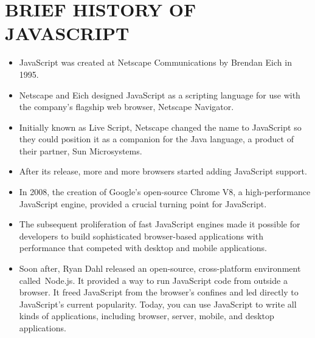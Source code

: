 \documentclass{article}
\begin{document}
		\section*{BRIEF HISTORY OF JAVASCRIPT}
		\begin{itemize}
			\item JavaScript was created at Netscape Communications by Brendan Eich in 1995. 
			\item Netscape and Eich designed JavaScript as a scripting language for use with the company's flagship web browser, Netscape Navigator. 
			\item Initially known as Live Script, Netscape changed the name to JavaScript so they could position it as a companion for the Java language, a product of their partner, Sun Microsystems.
			\item After its release, more and more browsers started adding JavaScript support. 
			\item In 2008, the creation of Google's open-source Chrome V8, a high-performance JavaScript engine, provided a crucial turning point for JavaScript. 
			\item The subsequent proliferation of fast JavaScript engines made it possible for developers to build sophisticated browser-based applications with performance that competed with desktop and mobile applications.
			\item Soon after, Ryan Dahl released an open-source, cross-platform environment called Node.js. It provided a way to run JavaScript code from outside a browser. It freed JavaScript from the browser's confines and led directly to JavaScript's current popularity. Today, you can use JavaScript to write all kinds of applications, including browser, server, mobile, and desktop applications. 
	\end{itemize}
	\newpage
\end{document}
